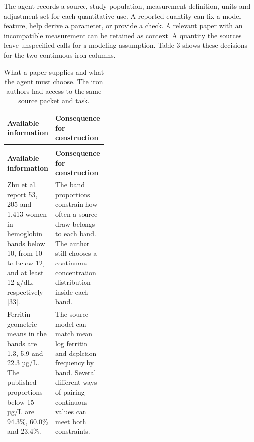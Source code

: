 \documentclass[11pt,letterpaper]{article}
\begin{document}
\endgroup

The agent records a source, study population, measurement definition, units and adjustment set for each quantitative use. A reported quantity can fix a model feature, help derive a parameter, or provide a check. A relevant paper with an incompatible measurement can be retained as context. A quantity the sources leave unspecified calls for a modeling assumption. Table 3 shows these decisions for the two continuous iron columns.


\FloatBarrier

\begingroup

\small

\renewcommand{\arraystretch}{1.22}

\begin{xltabular}{\linewidth}{@{}>{\raggedright\arraybackslash}p{0.40\linewidth}>{\raggedright\arraybackslash}X@{}}

\caption{What a paper supplies and what the agent must choose. The iron authors had access to the same source packet and task.}\label{tab:3} \\

\toprule

\textbf{Available information} & \textbf{Consequence for construction} \\

\midrule

\endfirsthead

\\

\toprule

\textbf{Available information} & \textbf{Consequence for construction} \\

\midrule

\endhead

\bottomrule

\endfoot

Zhu et al. report 53, 205 and 1,413 women in hemoglobin bands below 10, from 10 to below 12, and at least 12 g/\allowbreak{}dL, respectively [33]. & The band proportions constrain how often a source draw belongs to each band. The author still chooses a continuous concentration distribution inside each band. \\

Ferritin geometric means in the bands are 1.3, 5.9 and 22.3 µg/\allowbreak{}L. The published proportions below 15 µg/\allowbreak{}L are 94.3\%, 60.0\% and 23.4\%. & The source model can match mean log ferritin and depletion frequency by band. Several different ways of pairing continuous values can meet both constraints. \\


\end{xltabular}
\end{document}
